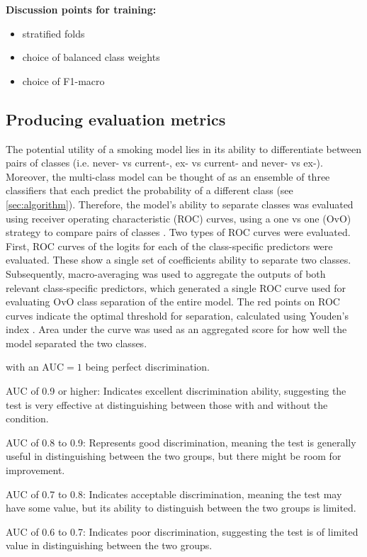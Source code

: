 \documentclass{article}
\begin{document}
\textbf{Discussion points for training:}
\begin{itemize}
    \item stratified folds
    \item choice of balanced class weights
    \item choice of F1-macro
\end{itemize}

\subsection{Producing evaluation metrics}
The potential utility of a smoking model lies in its ability to differentiate between pairs of classes (i.e. never- vs current-, ex- vs current- and never- vs ex-). Moreover, the multi-class model can be thought of as an ensemble of three classifiers that each predict the probability of a different class (see \ref{sec:algorithm}). Therefore, the model's ability to separate classes was evaluated using receiver operating characteristic (ROC) curves, using a one vs one (OvO) strategy to compare pairs of classes \cite{scikit-learn-roc-example}. Two types of ROC curves were evaluated. First, ROC curves of the logits for each of the class-specific predictors were evaluated. These show a single set of coefficients ability to separate two classes. Subsequently, macro-averaging \cite{scikit-learn-roc-example} was used to aggregate the outputs of both relevant class-specific predictors, which generated a single ROC curve used for evaluating OvO class separation of the entire model. 
The red points on ROC curves indicate the optimal threshold for separation, calculated using Youden's index \cite{youden1950index}. Area under the curve was used as an aggregated score for how well the model separated the two classes. 

with an AUC\(=1\) being perfect discrimination. 

AUC of 0.9 or higher:
Indicates excellent discrimination ability, suggesting the test is very effective at distinguishing between those with and without the condition. 

AUC of 0.8 to 0.9:
Represents good discrimination, meaning the test is generally useful in distinguishing between the two groups, but there might be room for improvement. 

AUC of 0.7 to 0.8:
Indicates acceptable discrimination, meaning the test may have some value, but its ability to distinguish between the two groups is limited. 

AUC of 0.6 to 0.7:
Indicates poor discrimination, suggesting the test is of limited value in distinguishing between the two groups. 
\end{document}
